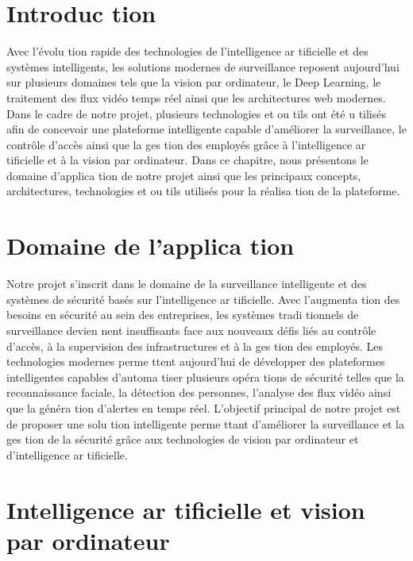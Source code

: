 \documentclass[12pt,a4paper]{report}
\numberwithin{figure}{chapter}
\numberwithin{table}{chapter}
\begin{document}
\section{Introduc tion}
Avec l’évolu tion rapide des technologies de l’intelligence ar tiﬁcielle et des systèmes intelligents, les
solutions modernes de surveillance reposent aujourd’hui sur plusieurs domaines tels que la vision par
ordinateur, le Deep Learning, le traitement des ﬂux vidéo temps réel ainsi que les architectures web
modernes.
Dans le cadre de notre projet, plusieurs technologies et ou tils ont été u tilisés aﬁn de concevoir une
plateforme intelligente capable d’améliorer la surveillance, le contrôle d’accès ainsi que la ges tion des
employés grâce à l’intelligence ar tiﬁcielle et à la vision par ordinateur.
Dans ce chapitre, nous présentons le domaine d’applica tion de notre projet ainsi que les principaux
concepts, architectures, technologies et ou tils utilisés pour la réalisa tion de la plateforme.
\section{Domaine de l’applica tion}
Notre projet s’inscrit dans le domaine de la surveillance intelligente et des systèmes de sécurité basés
sur l’intelligence ar tiﬁcielle. Avec l’augmenta tion des besoins en sécurité au sein des entreprises, les
systèmes tradi tionnels de surveillance devien nent insuﬃsants face aux nouveaux déﬁs liés au
contrôle d’accès, à la supervision des infrastructures et à la ges tion des employés.
Les technologies modernes perme ttent aujourd’hui de développer des plateformes intelligentes
capables d’automa tiser plusieurs opéra tions de sécurité telles que la reconnaissance faciale, la
détection des personnes, l’analyse des ﬂux vidéo ainsi que la généra tion d’alertes en temps réel.
L’objectif principal de notre projet est de proposer une solu tion intelligente perme ttant d’améliorer la
surveillance et la ges tion de la sécurité grâce aux technologies de vision par ordinateur et
d’intelligence ar tiﬁcielle.
\section{Intelligence ar tiﬁcielle et vision par ordinateur}
\end{document}
